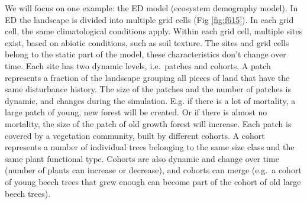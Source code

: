 \documentclass[12pt,oneside]{book}
\begin{document}
We will focus on one example: the ED model (ecosystem demography model).
In ED the landscape is divided into multiple grid cells (Fig
\ref{fig:f615}). In each grid cell, the same climatological conditions
apply. Within each grid cell, multiple sites exist, based on abiotic
conditions, such as soil texture. The sites and grid cells belong to the
static part of the model, these characteristics don't change over time.
Each site has two dynamic levels, i.e.~patches and cohorts. A patch
represents a fraction of the landscape grouping all pieces of land that
have the same disturbance history. The size of the patches and the
number of patches is dynamic, and changes during the simulation. E.g. if
there is a lot of mortality, a large patch of young, new forest will be
created. Or if there is almost no mortality, the size of the patch of
old growth forest will increase. Each patch is covered by a vegetation
community, built by different cohorts. A cohort represents a number of
individual trees belonging to the same size class and the same plant
functional type. Cohorts are also dynamic and change over time (number
of plants can increase or decrease), and cohorts can merge (e.g.~a
cohort of young beech trees that grew enough can become part of the
cohort of old large beech trees).
\end{document}
